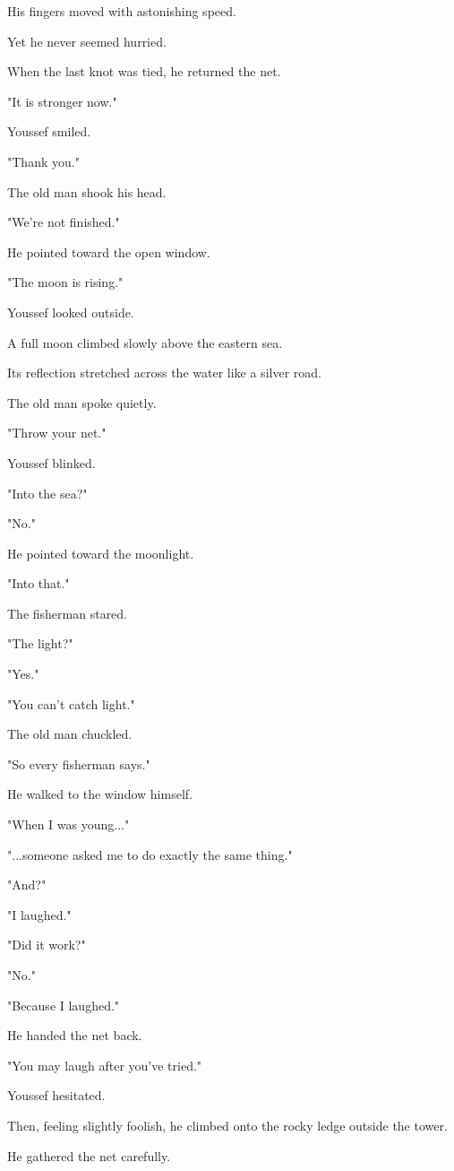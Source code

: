 \documentclass[12pt,openany]{book}
\begin{document}
His fingers moved with astonishing speed.

Yet he never seemed hurried.

When the last knot was tied, he returned the net.

"It is stronger now."

Youssef smiled.

"Thank you."

The old man shook his head.

"We're not finished."

He pointed toward the open window.

"The moon is rising."

Youssef looked outside.

A full moon climbed slowly above the eastern sea.

Its reflection stretched across the water like a silver road.

The old man spoke quietly.

"Throw your net."

Youssef blinked.

"Into the sea?"

"No."

He pointed toward the moonlight.

"Into that."

The fisherman stared.

"The light?"

"Yes."

"You can't catch light."

The old man chuckled.

"So every fisherman says."

He walked to the window himself.

"When I was young..."

"...someone asked me to do exactly the same thing."

"And?"

"I laughed."

"Did it work?"

"No."

"Because I laughed."

He handed the net back.

"You may laugh after you've tried."

Youssef hesitated.

Then, feeling slightly foolish, he climbed onto the rocky ledge outside the tower.

He gathered the net carefully.
\end{document}
